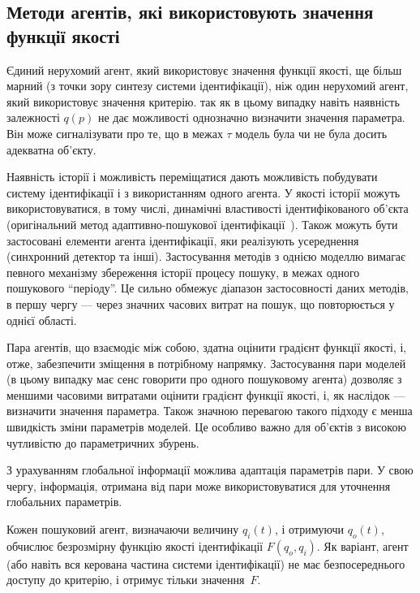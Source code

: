 
\subsection{Методи агентів, які використовують значення функції якості}%

Єдиний нерухомий агент, який використовує значення функції якості, ще більш марний
(з точки зору синтезу системи ідентифікації), ніж один нерухомий агент, який
використовує значення критерію.
%
так як в цьому випадку навіть наявність залежності
$q(p)$ не дає можливості однозначно визначити значення
параметра. Він може сигналізувати про те, що в межах \(\tau \) модель
була чи не була досить адекватна об'єкту.

Наявність історії і можливість переміщатися дають можливість
побудувати систему ідентифікації і з використанням одного агента.
У якості історії
можуть використовуватися, в тому числі, динамічні властивості
ідентифікованого об'єкта
(оригінальний метод адаптивно-пошукової ідентифікації~\cite{mich_92,mich_92}).
Також можуть бути застосовані елементи агента
ідентифікації, яки реалізують усереднення (синхронний детектор та інші).
Застосування методів з однією моделлю вимагає певного механізму
збереження історії процесу пошуку, в межах
одного пошукового ``періоду''. Це сильно обмежує діапазон
застосовності даних методів, в першу чергу --- через значних
часових витрат на пошук, що повторюється у однієї області.

Пара агентів, що взаємодіє між собою, здатна оцінити градієнт функції якості,
і, отже, забезпечити зміщення в потрібному напрямку.
Застосування пари моделей \cite{atu_asau3} (в цьому випадку має сенс
говорити про одного пошуковому агента) дозволяє з меншими
часовими витратами оцінити градієнт функції якості, і,
як наслідок --- визначити значення параметра. Також значною
перевагою такого підходу є менша швидкість зміни параметрів
моделей. Це особливо важно для об'єктів з високою чутливістю
до параметричних збурень.

З урахуванням глобальної інформації можлива адаптація
параметрів пари. У свою чергу, інформація, отримана від пари
може використовуватися для уточнення глобальних параметрів.

Кожен пошуковий агент, визначаючи величину $q_{i}(t)$, і отримуючи $q_o(t)$,
обчислює безрозмірну функцію якості ідентифікації $F(q_o,q_i)$. Як
варіант, агент (або навіть вся керована частина системи ідентифікації) не має
безпосереднього доступу до критерію, і отримує тільки значення~$F$.

